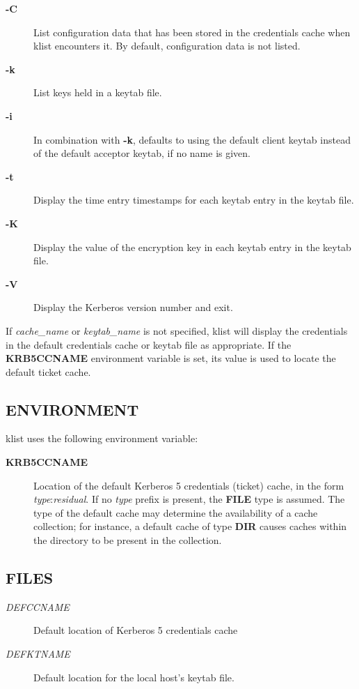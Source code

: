 \documentclass[letterpaper,10pt,english]{sphinxmanual}
\begin{document}
\begin{description}
\item[{\textbf{-C}}] \leavevmode
List configuration data that has been stored in the credentials
cache when klist encounters it.  By default, configuration data
is not listed.

\item[{\textbf{-k}}] \leavevmode
List keys held in a keytab file.

\item[{\textbf{-i}}] \leavevmode
In combination with \textbf{-k}, defaults to using the default client
keytab instead of the default acceptor keytab, if no name is
given.

\item[{\textbf{-t}}] \leavevmode
Display the time entry timestamps for each keytab entry in the
keytab file.

\item[{\textbf{-K}}] \leavevmode
Display the value of the encryption key in each keytab entry in
the keytab file.

\item[{\textbf{-V}}] \leavevmode
Display the Kerberos version number and exit.

\end{description}

If \emph{cache\_name} or \emph{keytab\_name} is not specified, klist will display
the credentials in the default credentials cache or keytab file as
appropriate.  If the \textbf{KRB5CCNAME} environment variable is set, its
value is used to locate the default ticket cache.


\subsection{ENVIRONMENT}
\label{user/user_commands/klist:environment}
klist uses the following environment variable:
\begin{description}
\item[{\textbf{KRB5CCNAME}}] \leavevmode
Location of the default Kerberos 5 credentials (ticket) cache, in
the form \emph{type}:\emph{residual}.  If no \emph{type} prefix is present, the
\textbf{FILE} type is assumed.  The type of the default cache may
determine the availability of a cache collection; for instance, a
default cache of type \textbf{DIR} causes caches within the directory
to be present in the collection.

\end{description}


\subsection{FILES}
\label{user/user_commands/klist:files}\begin{description}
\item[{\emph{DEFCCNAME}}] \leavevmode
Default location of Kerberos 5 credentials cache

\item[{\emph{DEFKTNAME}}] \leavevmode
Default location for the local host's keytab file.

\end{description}
\end{document}
